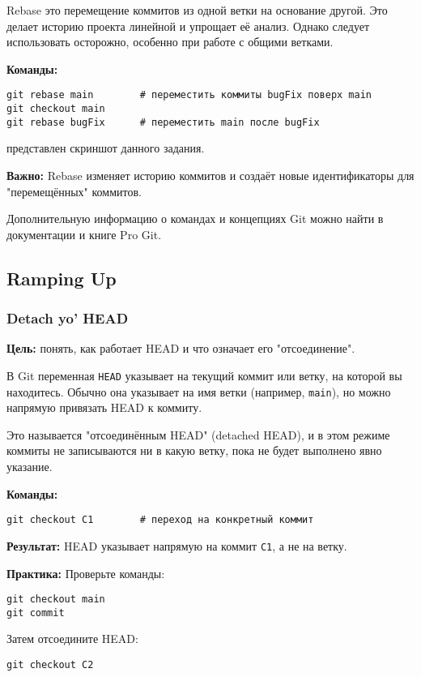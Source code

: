 \documentclass[a4paper,12pt]{report}
\begin{document}
Rebase \textendash{} это перемещение коммитов из одной ветки на основание другой. Это делает историю проекта линейной и упрощает её анализ. Однако следует использовать осторожно, особенно при работе с общими ветками.

\textbf{Команды:}
\begin{verbatim}
git rebase main        # переместить коммиты bugFix поверх main
git checkout main
git rebase bugFix      # переместить main после bugFix
\end{verbatim}

 представлен скриншот данного задания.

\textbf{Важно:} Rebase изменяет историю коммитов и создаёт новые идентификаторы для "перемещённых" коммитов.

Дополнительную информацию о командах и концепциях Git можно найти в документации и книге Pro Git.

\subsection{Ramping Up}

\subsubsection{Detach yo' HEAD}
\textbf{Цель:} понять, как работает HEAD и что означает его "отсоединение".

В Git переменная \texttt{HEAD} указывает на текущий коммит или ветку, на которой вы находитесь. Обычно она указывает на имя ветки (например, \texttt{main}), но можно напрямую привязать HEAD к коммиту.

Это называется "отсоединённым HEAD" (detached HEAD), и в этом режиме коммиты не записываются ни в какую ветку, пока не будет выполнено явно указание.

\textbf{Команды:}
\begin{verbatim}
git checkout C1        # переход на конкретный коммит
\end{verbatim}

\textbf{Результат:} HEAD указывает напрямую на коммит \texttt{C1}, а не на ветку.

\textbf{Практика:} Проверьте команды:
\begin{verbatim}
git checkout main
git commit
\end{verbatim}

Затем отсоедините HEAD:
\begin{verbatim}
git checkout C2
\end{verbatim}
\end{document}
